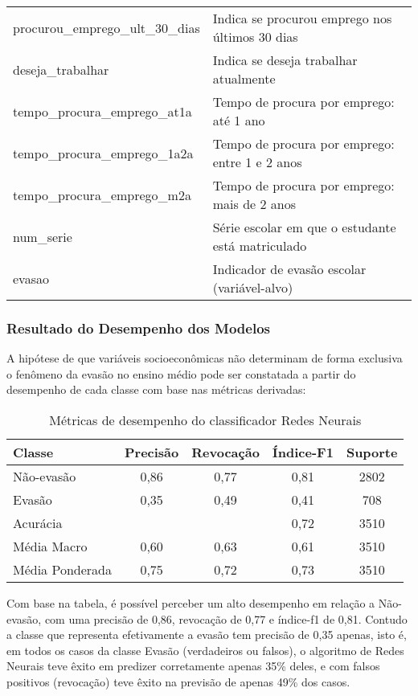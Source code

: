 \documentclass[english, spanish, brazilian]{RBIEarticle} %
\begin{document}
\begin{table}
\begin{tabular}{lp{8cm}}
procurou\_emprego\_ult\_30\_dias & Indica se procurou emprego nos últimos 30 dias \\
deseja\_trabalhar & Indica se deseja trabalhar atualmente \\
tempo\_procura\_emprego\_at1a & Tempo de procura por emprego: até 1 ano \\
tempo\_procura\_emprego\_1a2a & Tempo de procura por emprego: entre 1 e 2 anos \\
tempo\_procura\_emprego\_m2a & Tempo de procura por emprego: mais de 2 anos \\
num\_serie & Série escolar em que o estudante está matriculado \\
evasao & Indicador de evasão escolar (variável-alvo) \\ \hline
\end{tabular}
\end{table}


\subsubsection{Resultado do Desempenho dos Modelos}
A hipótese de que variáveis socioeconômicas não determinam de forma exclusiva o fenômeno da evasão no ensino médio pode ser constatada a partir do desempenho de cada classe com base nas métricas derivadas:

\vspace{0.5cm}
\begin{table}[htbp]
\centering
\label{tab:metricas}
\begin{tabular}{lcccc}
\hline
Classe        & Precisão & Revocação & Índice-F1 & Suporte \\ \hline
Não-evasão           & 0,86     & 0,77      & 0,81     & 2802    \\
Evasão           & 0,35     & 0,49      & 0,41     & 708     \\ \hline
Acurácia      &          &           & 0,72     & 3510    \\
Média Macro   & 0,60     & 0,63      & 0,61     & 3510    \\
Média Ponderada & 0,75   & 0,72      & 0,73     & 3510    \\ \hline
\end{tabular}
\caption{Métricas de desempenho do classificador Redes Neurais}
\end{table}
\vspace{0.5cm}

Com base na tabela, é possível perceber um alto desempenho em relação a Não-evasão, com uma precisão de 0,86, revocação de 0,77 e índice-f1 de 0,81. Contudo a classe que representa efetivamente a evasão tem precisão de 0,35 apenas, isto é, em todos os casos da classe Evasão (verdadeiros ou falsos), o algoritmo de Redes Neurais teve êxito em predizer corretamente apenas 35\% deles, e com falsos positivos (revocação) teve êxito na previsão de apenas 49\% dos casos. 
\end{document}
